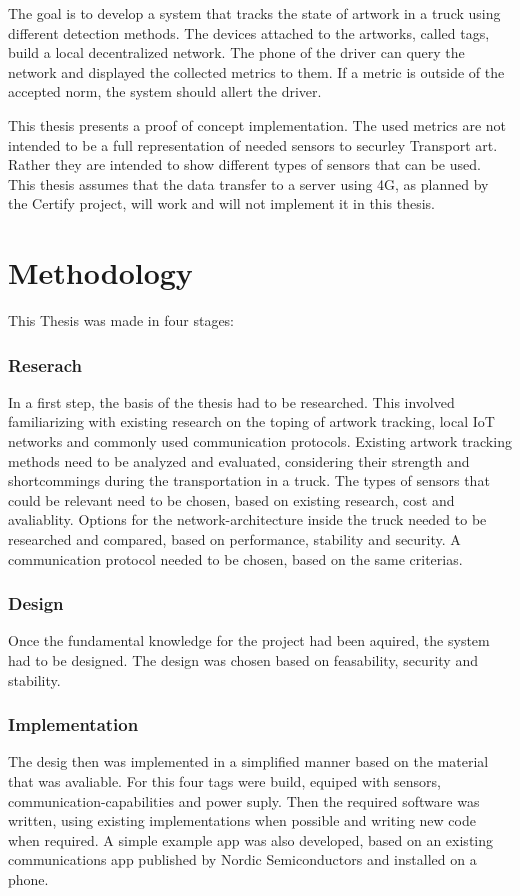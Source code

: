 The goal is to develop a system that tracks the state of artwork in a truck using different detection methods.
The devices attached to the artworks, called tags, build a local decentralized network.
The phone of the driver can query the network and displayed the collected metrics to them.
If a metric is outside of the accepted norm, the system should allert the driver.

This thesis presents a proof of concept implementation.
The used metrics are not intended to be a full representation of needed sensors to securley Transport art.
Rather they are intended to show different types of sensors that can be used.
This thesis assumes that the data transfer to a server using 4G, as planned by the Certify project, will work and will not implement it in this thesis.



\section{Methodology}

This Thesis was made in four stages:

\subsubsection{Reserach}
In a first step, the basis of the thesis had to be researched.
This involved familiarizing with existing research on the toping of artwork tracking, local IoT networks and commonly used communication protocols.
Existing artwork tracking methods need to be analyzed and evaluated, considering their strength and shortcommings during the transportation in a truck.
The types of sensors that could be relevant need to be chosen, based on existing research, cost and avaliablity.
Options for the network-architecture inside the truck needed to be researched and compared, based on performance, stability and security.
A communication protocol needed to be chosen, based on the same criterias.

\subsubsection{Design}
Once the fundamental knowledge for the project had been aquired, the system had to be designed.
The design was chosen based on feasability, security and stability.

\subsubsection{Implementation}
The desig then was implemented in a simplified manner based on the material that was avaliable.
For this four tags were build, equiped with sensors, communication-capabilities and power suply.
Then the required software was written, using existing implementations when possible and writing new code when required.
A simple example app was also developed, based on an existing communications app published by Nordic Semiconductors and installed on a phone.

